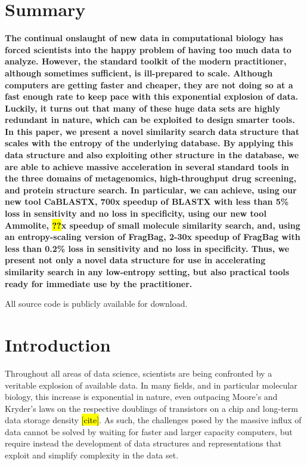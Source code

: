 \documentclass[review,preprint,12pt]{elsarticle}
\theoremstyle{definition}
\theoremstyle{remark}
\numberwithin{equation}{section}
\begin{document}
\section{Summary}
{ \bfseries
    The continual onslaught of new data in computational biology has forced scientists into the happy problem of having too much data to analyze.
    However, the standard toolkit of the modern practitioner, although sometimes sufficient, is ill-prepared to scale.
    Although computers are getting faster and cheaper, they are not doing so at a fast enough rate to keep pace with this exponential explosion of data.
    Luckily, it turns out that many of these huge data sets are highly redundant in nature, which can be exploited to design smarter tools.
    In this paper, we present a novel similarity search data structure that scales with the entropy of the underlying database.
    By applying this data structure and also exploiting other structure in the database, we are able to achieve massive acceleration in several standard tools in the three domains of metagenomics, high-throughput drug screening, and protein structure search.
    In particular, we can achieve, using our new tool CaBLASTX, 700x speedup of BLASTX with less than 5\% loss in sensitivity and no loss in specificity, using our new tool Ammolite, \hl{??}x speedup of small molecule similarity search, and, using an entropy-scaling version of FragBag, 2-30x speedup of FragBag with less than 0.2\% loss in sensitivity and no loss in specificity.
    Thus, we present not only a novel data structure for use in accelerating similarity search in any low-entropy setting, but also practical tools ready for immediate use by the practitioner.

    All source code is publicly available for download.
}

\section{Introduction}
Throughout all areas of data science, scientists are being confronted by a veritable explosion of available data.
In many fields, and in particular molecular biology, this increase is exponential in nature, even outpacing Moore's and Kryder's laws on the respective doublings of transistors on a chip and long-term data storage density \hl{[cite]}.
As such, the challenges posed by the massive influx of data cannot be solved by waiting for faster and larger capacity computers, but require instead the development of data structures and representations that exploit and simplify complexity in the data set.
\end{document}

